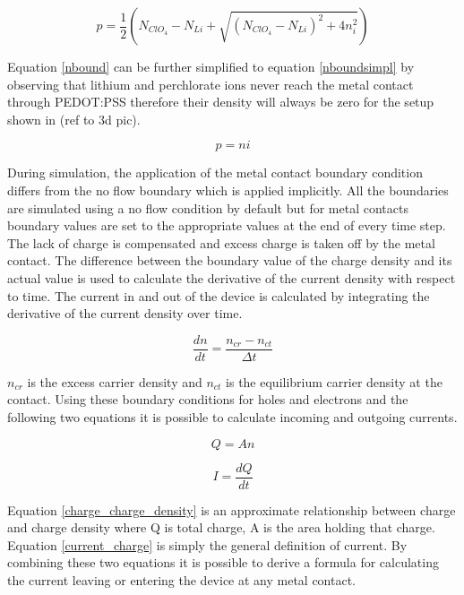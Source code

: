 \begin{doublespace}
\begin{equation}
p=\frac{1}{2}(N_{ClO_{4}} -  N_{Li} + \sqrt{(N_{ClO_{4}} -  N_{Li})^2+4n_i^2})
\label{nbound}
\end{equation}

Equation \ref{nbound} can be further simplified to equation \ref{nboundsimpl} by observing that lithium and perchlorate ions never reach the metal contact through PEDOT:PSS therefore their density will always be zero for the setup shown in (ref to 3d pic).  

\begin{equation}
p=ni
\label{nboundsimpl}
\end{equation}

During simulation, the application of the metal contact boundary condition differs from the no flow boundary which is applied implicitly. All the boundaries are simulated using a no flow condition by default but for metal contacts boundary values are set to the appropriate values at the end of every time step. The lack of charge is compensated and excess charge is taken off by the metal contact. The difference between the boundary value of the charge density and its actual value is used to calculate the derivative of the current density with respect to time. The current in and out of the device is calculated by integrating the derivative of the current density over time. 

\begin{equation}
\frac{dn}{dt}=\frac{n_{cr}-n_{ct}}{\Delta t}
\end{equation}

$n_{cr}$ is the excess carrier density and $n_{ct}$ is the equilibrium carrier density at the contact. Using these boundary conditions for holes and electrons and the following two equations it is possible to calculate incoming and outgoing currents. 

\begin{equation}
Q=An
\label{charge_charge_density}
\end{equation} 

\begin{equation}
I=\frac{dQ}{dt}
\label{current_charge}
\end{equation} 
 

Equation \ref{charge_charge_density} is an approximate relationship between charge and charge density where Q is total charge, A is the area holding that charge. Equation \ref{current_charge} is simply the general definition of current. By combining these two equations it is possible to derive a formula for calculating the current leaving or entering the device at any metal contact.


\end{doublespace}
